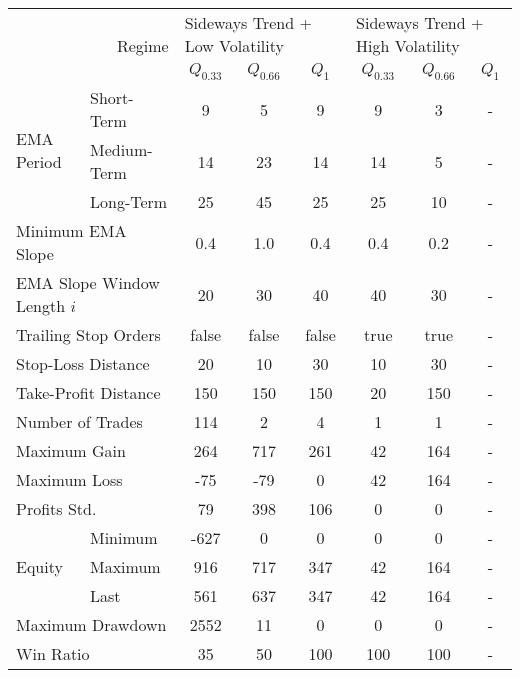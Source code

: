 \centering
\begin{tabular}{ll|cccccc}
    \toprule
    \multicolumn{2}{r|}{\multirow{2}{*}{Regime}} & \multicolumn{3}{l}{Sideways Trend + Low Volatility} & \multicolumn{3}{l}{Sideways Trend + High Volatility}  \\
    \multicolumn{2}{r|}{} & $Q_{0.33}$ & $Q_{0.66}$ & $Q_{1}$ & $Q_{0.33}$ & $Q_{0.66}$ & $Q_{1}$ \\
    \midrule
    \multirow{3}{*}{EMA Period} & Short-Term  & 9    & 5   & 9   & 9  & 3   & - \\
    & Medium-Term & 14   & 23  & 14  & 14 & 5   & - \\
    & Long-Term   & 25   & 45  & 25  & 25 & 10  & - \\
    \multicolumn{2}{l|}{Minimum EMA Slope} & 0.4 & 1.0 & 0.4 & 0.4 & 0.2 & - \\
    \multicolumn{2}{l|}{EMA Slope Window Length $i$} & 20 & 30 & 40 & 40 & 30 & - \\
    \multicolumn{2}{l|}{Trailing Stop Orders} & false & false & false & true & true & - \\
    \multicolumn{2}{l|}{Stop-Loss Distance} & 20 & 10 & 30 & 10 & 30 & - \\
    \multicolumn{2}{l|}{Take-Profit Distance} & 150 & 150 & 150 & 20 & 150 & - \\
    \midrule
    \multicolumn{2}{l|}{Number of Trades} & 114 & 2 & 4 & 1 & 1 & - \\
    \multicolumn{2}{l|}{Maximum Gain} & 264 & 717 & 261 & 42 & 164 & - \\
    \multicolumn{2}{l|}{Maximum Loss} & -75 & -79 & 0 & 42 & 164 & - \\
    \multicolumn{2}{l|}{Profits Std.} & 79 & 398 & 106 & 0 & 0 & - \\
    \multirow{3}{*}{Equity}     & Minimum     & -627 & 0   & 0   & 0  & 0   & - \\
    & Maximum     & 916  & 717 & 347 & 42 & 164 & - \\
    & Last        & 561  & 637 & 347 & 42 & 164 & - \\
    \multicolumn{2}{l|}{Maximum Drawdown} & 2552 & 11 & 0 & 0 & 0 & - \\
    \multicolumn{2}{l|}{Win Ratio} & 35 & 50 & 100 & 100 & 100 & - \\
    \bottomrule
\end{tabular}